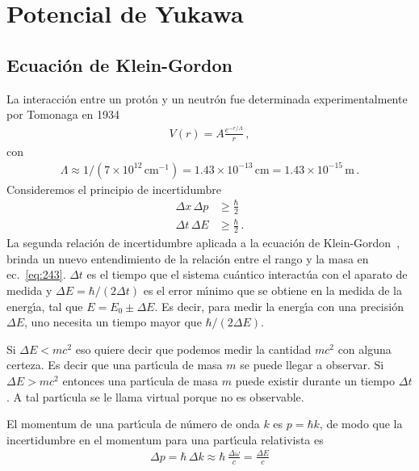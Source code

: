 

\chapter{Potencial de Yukawa}


\section{Ecuaci\'on de Klein-Gordon}
\label{sec:ecuacion-de-klein}
La interacci\'on entre un prot\'on y un neutr\'on fue determinada experimentalmente por Tomonaga en 1934 \cite{history}
\begin{align}
\label{eq:243}
  V(r)={A}\frac{e^{-r/\Lambda }}{r}\,,
\end{align}
con
\begin{align}
  \label{eq:245}
  \Lambda\approx1/(7\times10^{12}\,\text{cm}^{-1})=1.43\times10^{-13}\,\text{cm}=1.43\times10^{-15}\,\text{m}\,.
\end{align}
Consideremos el principio de incertidumbre
\begin{align}
  \Delta x\, \Delta p &\geq \frac{\hbar}{2}\nonumber\\
\Delta t\, \Delta E&\geq\frac{\hbar}{2}\,.
\end{align}
La segunda relaci\'on de incertidumbre
aplicada a la ecuación de Klein-Gordon~\cite{Aitchison:2003tq}, brinda un nuevo entendimiento de la relaci\'on entre el rango y la masa en ec.~\eqref{eq:243}. $\Delta t$ es el tiempo que el sistema cu\'antico interact\'ua con el aparato de medida y $\Delta E=\hbar/(2\Delta t)$ es el error m\'\i nimo que se obtiene en la medida de la energ\'\i a, tal que $E=E_0\pm\Delta E$. Es decir, para medir la energ\'\i a con una precisi\'on $\Delta E$, uno necesita un tiempo mayor que $\hbar/(2\Delta E)$.

Si $\Delta E< mc^2$ eso quiere decir que podemos medir la cantidad $mc^2$ con alguna certeza. Es decir que una part\'\i cula de masa $m$ se puede llegar a observar. Si $\Delta E>mc^2$ entonces una part\'\i cula de masa $m$ puede existir durante un tiempo $\Delta t$. A tal part\'\i cula se le llama virtual porque no es observable. 

El momentum de una part\'\i cula de n\'umero de onda $k$ es $p=\hbar k$, de modo que la incertidumbre en el momentum para una part\'\i cula relativista es
\begin{align}
  \Delta p=\hbar\, \Delta k \approx\hbar\, \frac{\Delta\omega}{c}=\frac{\Delta E}{c}
\end{align}

